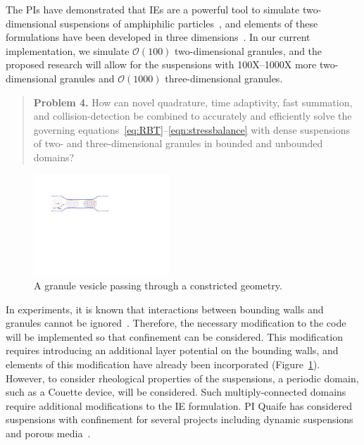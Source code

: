 The PIs have demonstrated that IEs are a powerful tool to simulate
two-dimensional suspensions of amphiphilic particles~\cite{Fu2018_SIAM,
FuQuRyYo22, fu-ryh-qua-you2022}, and elements of these formulations have
been developed in three dimensions~\cite{ying_2006, manasthesis,
rac-gre2016}. In our current implementation, we simulate
$\mathcal{O}(100)$ two-dimensional granules, and the proposed research
will allow for the suspensions with 100X--1000X more two-dimensional
granules and $\mathcal{O}(1000)$ three-dimensional granules. 

\begin{quotation}
  \noindent
  \textbf{Problem 4.} How can novel quadrature, time adaptivity, fast
  summation, and collision-detection be combined to accurately and
  efficiently solve the governing
  equations~\eqref{eq:RBT}--\eqref{eqn:stressbalance} with dense
  suspensions of two- and three-dimensional granules in bounded and
  unbounded domains?
\end{quotation}

\begin{figure}
  \centering
  \includegraphics[width=2in]{figures/SA2Figures/confinement.pdf}
  \caption{\label{fig:stenosis} \footnotesize A granule vesicle passing
  through a constricted geometry.}
\end{figure}

In experiments, it is known that interactions between bounding walls and
granules cannot be ignored~\cite{qua-gan-you2021,
KaouiHartingMisbah2011_PRE, her-sto-gra2005}. Therefore, the necessary
modification to the code will be implemented so that confinement can be
considered. This modification requires introducing an additional layer
potential on the bounding walls, and elements of this modification have
already been incorporated (Figure~\ref{fig:stenosis}). However, to
consider rheological properties of the suspensions, a periodic domain,
such as a Couette device, will be considered. Such multiply-connected
domains require additional modifications to the IE formulation. PI
Quaife has considered suspensions with confinement for several projects
including dynamic suspensions~\cite{qua-bir2014, bys-sha-qua2020} and
porous media~\cite{chi-moo-qua2020, dea-qua-bir-jua2018,
moo-che-chi-qua2022, qua-gan-you2021}.

